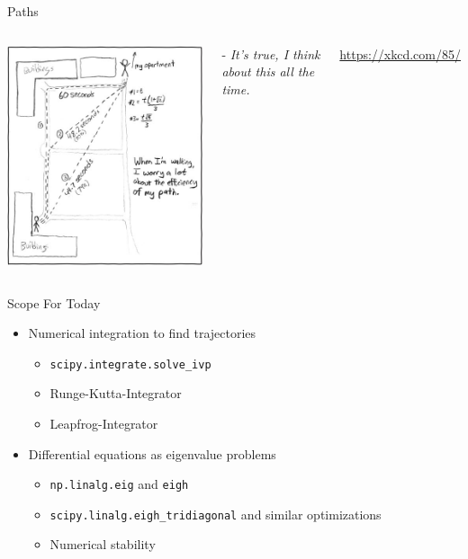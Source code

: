 
\begin{frame}[t,plain]
\titlepage
\end{frame}


\begin{frame}{Paths}
%
\begin{columns}
\begin{center}
\includegraphics[width=0.6\linewidth]{./gfx/07-xkcd-paths}\\
\end{center}-
%
\small
	\emph{It's true, I think about this all the time.}

	\vspace{6pt}
	\url{https://xkcd.com/85/}
\end{columns}
%
\end{frame}


\begin{frame}{Scope For Today}
%
\begin{itemize}
\item Numerical integration to find trajectories
	\begin{itemize}
	\item \texttt{scipy.integrate.solve\_ivp}
	\item Runge-Kutta-Integrator
	\item Leapfrog-Integrator
	\end{itemize}
\item Differential equations as eigenvalue problems
	\begin{itemize}
	\item \texttt{np.linalg.eig} and \texttt{eigh}
	\item \texttt{scipy.linalg.eigh\_tridiagonal} and similar optimizations
	\item Numerical stability
	\end{itemize}
\end{itemize}
%
\end{frame}

